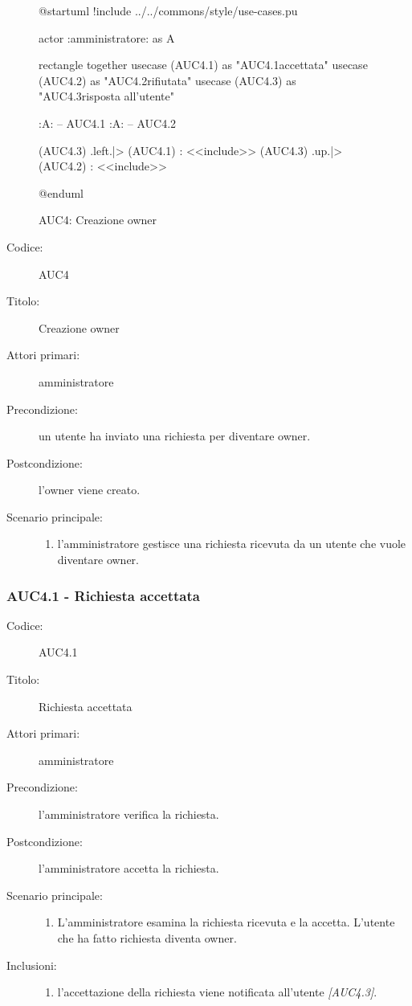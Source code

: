 \documentclass[../../../analisi-dei-requisiti.tex]{subfiles}
\begin{document}
\begin{figure}[H]
  \centering
  \begin{plantuml}
  @startuml
  !include ../../commons/style/use-cases.pu

  actor :amministratore: as A

  rectangle {
    together {
      usecase (AUC4.1) as "AUC4.1\nRichiesta accettata"
      usecase (AUC4.2) as "AUC4.2\nRichiesta rifiutata"
    }
    usecase (AUC4.3) as "AUC4.3\nInvio risposta all'utente"
  }

  :A: -- AUC4.1
  :A: -- AUC4.2

  (AUC4.3) .left.|> (AUC4.1) : <<include>>
  (AUC4.3) .up.|> (AUC4.2) : <<include>>

  @enduml
  \end{plantuml}
  \caption{AUC4: Creazione owner}
  \label{fig:AUC4}
\end{figure}

\begin{description}
  \item[Codice:] AUC4
  \item[Titolo:] Creazione owner
  \item[Attori primari:] amministratore
  \item[Precondizione:] un utente ha inviato una richiesta per diventare owner.
  \item[Postcondizione:] l'owner viene creato.
  \item[Scenario principale:]
  \begin{enumerate}
    \item l'amministratore gestisce una richiesta ricevuta da un utente che vuole diventare owner.
  \end{enumerate}
\end{description}


\subsubsection{AUC4.1 - Richiesta accettata}%
\label{subs:AUC4.1}

\begin{description}
  \item[Codice:] AUC4.1
  \item[Titolo:] Richiesta accettata
  \item[Attori primari:] amministratore
  \item[Precondizione:] l'amministratore verifica la richiesta.
  \item[Postcondizione:] l'amministratore accetta la richiesta.
  \item[Scenario principale:]
  \begin{enumerate}
    \item L'amministratore esamina la richiesta ricevuta e la accetta. L'utente che ha fatto richiesta diventa owner.
  \end{enumerate}
  \item[Inclusioni:]
  \begin{enumerate}
    \item l'accettazione della richiesta viene notificata all'utente \emph{[AUC4.3]}.
  \end{enumerate}
\end{description}
\end{document}
